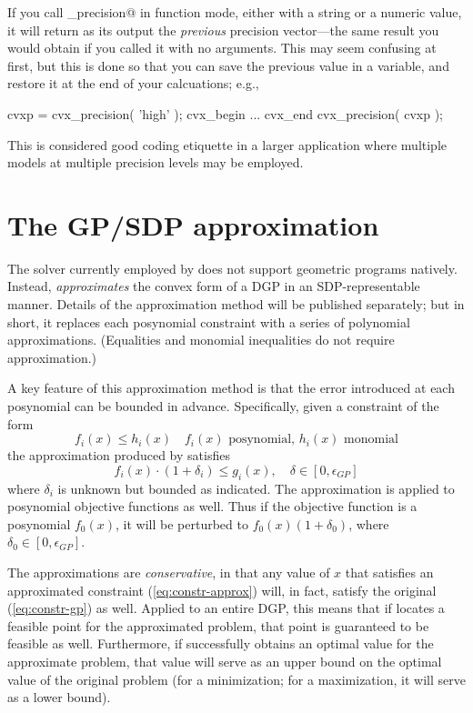 \documentclass[12pt]{article}
\begin{document}
If you call \verb@cvx_precision@ in function mode, either with a string or a numeric
value, it will return as its output the \emph{previous} precision vector---the same
result you would obtain if you called it with no arguments. This may
seem confusing at first, but this is done so that you can save the previous value
in a variable, and restore it at the end of your calcuations; e.g.,
\begin{code}
	cvxp = cvx_precision( 'high' );
	cvx_begin
		...
	cvx_end
	cvx_precision( cvxp );
\end{code}
This is considered good coding etiquette in a larger application where multiple 
\cvx models at multiple precision levels may be employed.

\section{The GP/SDP approximation}
\label{sec:gp-approx}

The solver currently employed by \cvx does not support geometric programs natively.
Instead, \cvx \emph{approximates} the convex form of a DGP in an SDP-representable
manner. Details of the approximation method will be published separately; but in short,
it replaces each posynomial constraint with a series of polynomial
approximations. (Equalities and monomial inequalities do not require approximation.)

A key feature of this approximation method is that the error introduced at
each posynomial can be bounded in advance. Specifically,
given a constraint of the form
\begin{equation}
	\label{eq:constr-gp}
	f_i(x) \leq h_i(x) \quad f_i(x)\text{ posynomial, }h_i(x)\text{ monomial}
\end{equation}
the approximation produced by \cvx satisfies
\begin{equation}
	\label{eq:constr-approx}
	f_i(x) \cdot ( 1 + \delta_i ) \leq g_i(x), \quad \delta\in[0,\epsilon_{GP}]
\end{equation}
where $\delta_i$ is unknown but bounded as indicated.
The approximation is applied to posynomial objective functions as well. Thus
if the objective function is a posynomial $f_0(x)$, it will be perturbed to
$f_0(x)(1+\delta_0)$, where $\delta_0\in[0,\epsilon_{GP}]$. 

The approximations are \emph{conservative}, in that any value of $x$ that
satisfies an approximated constraint (\ref{eq:constr-approx})
will, in fact, satisfy the original (\ref{eq:constr-gp}) as well.
Applied to an entire DGP, this means that if \cvx locates a feasible point for
the approximated problem, that point is guaranteed to be feasible as well.
Furthermore, if \cvx successfully obtains an optimal value for the approximate
problem, that value will serve as an upper bound on the optimal value of
the original problem (for a minimization; for a maximization, it will serve
as a lower bound). 
\end{document}

